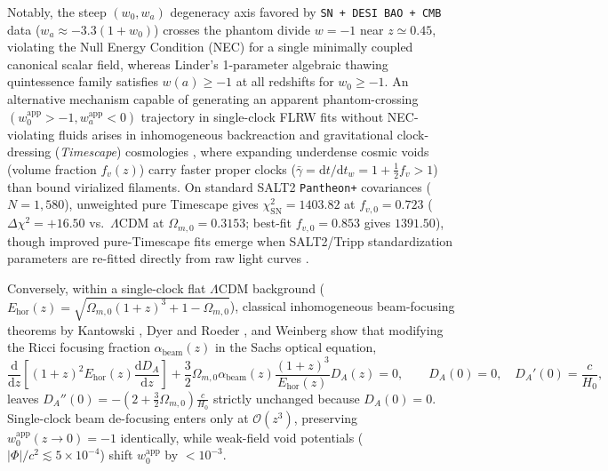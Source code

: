 \documentclass[11pt,a4paper]{article}
\begin{document}
Notably, the steep $(w_0, w_a)$ degeneracy axis favored by \texttt{SN + DESI BAO + CMB} data ($w_a \approx -3.3(1+w_0)$) crosses the phantom divide $w = -1$ near $z \simeq 0.45$, violating the Null Energy Condition (NEC) for a single minimally coupled canonical scalar field, whereas Linder's \cite{Linder2015Thawing} 1-parameter algebraic thawing quintessence family satisfies $w(a) \ge -1$ at all redshifts for $w_0 \ge -1$. An alternative mechanism capable of generating an apparent phantom-crossing $(w_0^{\mathrm{app}} > -1, w_a^{\mathrm{app}} < 0)$ trajectory in single-clock FLRW fits without NEC-violating fluids arises in inhomogeneous backreaction and gravitational clock-dressing (\textit{Timescape}) cosmologies \cite{Wiltshire2009PRD,LaneWiltshire2025MNRAS,SeifertWiltshire2025MNRAS}, where expanding underdense cosmic voids (volume fraction $f_v(z)$) carry faster proper clocks ($\bar{\gamma} = \mathrm{d}t/\mathrm{d}t_w = 1 + \frac{1}{2}f_v > 1$) than bound virialized filaments. On standard SALT2 \texttt{Pantheon+} covariances ($N = 1,580$), unweighted pure Timescape gives $\chi^2_{\mathrm{SN}} = 1403.82$ at $f_{v,0} = 0.723$ ($\Delta\chi^2 = +16.50$ vs.\ $\Lambda$CDM at $\Omega_{m,0} = 0.3153$; best-fit $f_{v,0} = 0.853$ gives $1391.50$), though improved pure-Timescape fits emerge when SALT2/Tripp standardization parameters are re-fitted directly from raw light curves \cite{LaneWiltshire2025MNRAS,SeifertWiltshire2025MNRAS}.

Conversely, within a single-clock flat $\Lambda$CDM background ($E_{\mathrm{hor}}(z) = \sqrt{\Omega_{m,0}(1+z)^3 + 1 - \Omega_{m,0}}$), classical inhomogeneous beam-focusing theorems by Kantowski \cite{Kantowski1969}, Dyer and Roeder \cite{DyerRoeder1973}, and Weinberg \cite{Weinberg1976} show that modifying the Ricci focusing fraction $\alpha_{\mathrm{beam}}(z)$ in the Sachs optical equation,
\begin{equation}
    \frac{\mathrm{d}}{\mathrm{d}z}\!\left[(1+z)^2 E_{\mathrm{hor}}(z)\frac{\mathrm{d}D_A}{\mathrm{d}z}\right] + \frac{3}{2}\Omega_{m,0}\alpha_{\mathrm{beam}}(z)\frac{(1+z)^3}{E_{\mathrm{hor}}(z)}D_A(z) = 0, \qquad D_A(0) = 0,\quad D_A'(0) = \frac{c}{H_0},
    \label{eq:dyer-roeder}
\end{equation}
leaves $D_A''(0) = -(2 + \frac{3}{2}\Omega_{m,0})\frac{c}{H_0}$ strictly unchanged because $D_A(0) = 0$. Single-clock beam de-focusing enters only at $\mathcal{O}(z^3)$, preserving $w_0^{\mathrm{app}}(z \to 0) = -1$ identically, while weak-field void potentials ($|\Phi|/c^2 \lesssim 5\times 10^{-4}$) shift $w_0^{\mathrm{app}}$ by $< 10^{-3}$.
\end{document}
